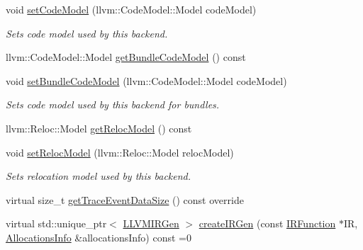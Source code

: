\begin{DoxyCompactItemize}
\mbox{\label{classglow_1_1_l_l_v_m_backend_aeff9aa88b3dcf88e9a3b869796a74ad5}} 
void \hyperlink{classglow_1_1_l_l_v_m_backend_aeff9aa88b3dcf88e9a3b869796a74ad5}{set\+Code\+Model} (llvm\+::\+Code\+Model\+::\+Model code\+Model)
\begin{DoxyCompactList}\small\item\em Sets code model used by this backend. \end{DoxyCompactList}\item 
llvm\+::\+Code\+Model\+::\+Model \hyperlink{classglow_1_1_l_l_v_m_backend_a0a46b08e9f98465201150b2e4715a103}{get\+Bundle\+Code\+Model} () const
\item 
\mbox{\label{classglow_1_1_l_l_v_m_backend_a4a72991e9949b04a4d9b1b4ec0c78dfb}} 
void \hyperlink{classglow_1_1_l_l_v_m_backend_a4a72991e9949b04a4d9b1b4ec0c78dfb}{set\+Bundle\+Code\+Model} (llvm\+::\+Code\+Model\+::\+Model code\+Model)
\begin{DoxyCompactList}\small\item\em Sets code model used by this backend for bundles. \end{DoxyCompactList}\item 
llvm\+::\+Reloc\+::\+Model \hyperlink{classglow_1_1_l_l_v_m_backend_a4fb94879cb2a28a58bc4a55dc75be995}{get\+Reloc\+Model} () const
\item 
\mbox{\label{classglow_1_1_l_l_v_m_backend_ab324cd30e2052408959378c2971208ba}} 
void \hyperlink{classglow_1_1_l_l_v_m_backend_ab324cd30e2052408959378c2971208ba}{set\+Reloc\+Model} (llvm\+::\+Reloc\+::\+Model reloc\+Model)
\begin{DoxyCompactList}\small\item\em Sets relocation model used by this backend. \end{DoxyCompactList}\item 
virtual size\+\_\+t \hyperlink{classglow_1_1_l_l_v_m_backend_a68a62d93b6005ee8678d34c70365417b}{get\+Trace\+Event\+Data\+Size} () const override
\item 
virtual std\+::unique\+\_\+ptr$<$ \hyperlink{classglow_1_1_l_l_v_m_i_r_gen}{L\+L\+V\+M\+I\+R\+Gen} $>$ \hyperlink{classglow_1_1_l_l_v_m_backend_a10f19018bc4af0aecb2b68f4f532997c}{create\+I\+R\+Gen} (const \hyperlink{classglow_1_1_i_r_function}{I\+R\+Function} $\ast$IR, \hyperlink{structglow_1_1_allocations_info}{Allocations\+Info} \&allocations\+Info) const =0
\end{DoxyCompactItemize}
